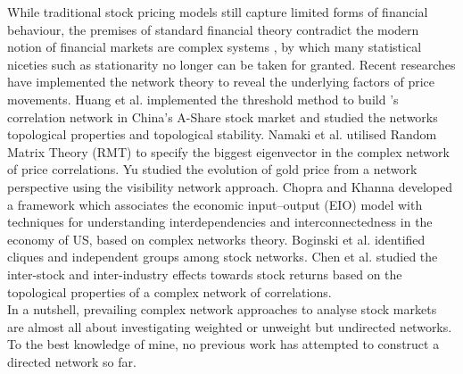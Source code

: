 While traditional stock pricing models still capture limited forms of financial behaviour, the premises of standard financial theory contradict the modern notion of financial markets are complex systems \cite{financialcomplex}, by which many statistical niceties such as stationarity no longer can be taken for granted. Recent researches have implemented the network theory to reveal the underlying factors of price movements. Huang et al. \cite{chinesenetwork} implemented the threshold method to build ’s correlation network in China's A-Share stock market and studied the networks topological properties and topological stability. Namaki et al. \cite{genuine} utilised Random Matrix Theory (RMT) to specify the biggest eigenvector in the complex network of price correlations. Yu \cite{visibility} studied the evolution of gold price from a network perspective using the visibility network approach. Chopra and Khanna \cite{intercd} developed a framework which associates the economic input–output (EIO) model with techniques for understanding interdependencies and interconnectedness in the economy of US, based on complex networks theory. Boginski et al. \cite{statisticalanalysis} identified cliques and independent groups among stock networks. Chen et al. \cite{profitable} studied the inter-stock and inter-industry effects towards stock returns based on the topological properties of a complex network of correlations.\\[2mm]
In a nutshell, prevailing complex network approaches to analyse stock markets are almost all about investigating weighted or unweight but undirected networks. To the best knowledge of mine, no previous work has attempted to construct a directed network so far.

